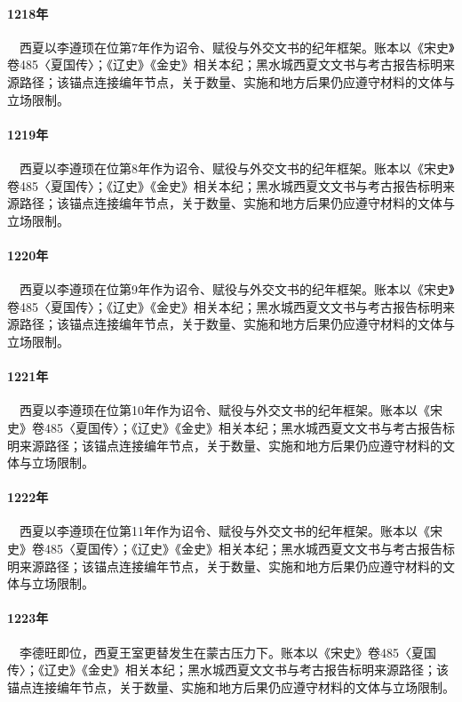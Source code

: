 \paragraph{1218年}　西夏以李遵顼在位第7年作为诏令、赋役与外交文书的纪年框架。账本以《宋史》卷485〈夏国传〉；《辽史》《金史》相关本纪；黑水城西夏文文书与考古报告标明来源路径；该锚点连接编年节点，关于数量、实施和地方后果仍应遵守材料的文体与立场限制。

\paragraph{1219年}　西夏以李遵顼在位第8年作为诏令、赋役与外交文书的纪年框架。账本以《宋史》卷485〈夏国传〉；《辽史》《金史》相关本纪；黑水城西夏文文书与考古报告标明来源路径；该锚点连接编年节点，关于数量、实施和地方后果仍应遵守材料的文体与立场限制。

\paragraph{1220年}　西夏以李遵顼在位第9年作为诏令、赋役与外交文书的纪年框架。账本以《宋史》卷485〈夏国传〉；《辽史》《金史》相关本纪；黑水城西夏文文书与考古报告标明来源路径；该锚点连接编年节点，关于数量、实施和地方后果仍应遵守材料的文体与立场限制。

\paragraph{1221年}　西夏以李遵顼在位第10年作为诏令、赋役与外交文书的纪年框架。账本以《宋史》卷485〈夏国传〉；《辽史》《金史》相关本纪；黑水城西夏文文书与考古报告标明来源路径；该锚点连接编年节点，关于数量、实施和地方后果仍应遵守材料的文体与立场限制。

\paragraph{1222年}　西夏以李遵顼在位第11年作为诏令、赋役与外交文书的纪年框架。账本以《宋史》卷485〈夏国传〉；《辽史》《金史》相关本纪；黑水城西夏文文书与考古报告标明来源路径；该锚点连接编年节点，关于数量、实施和地方后果仍应遵守材料的文体与立场限制。

\paragraph{1223年}　李德旺即位，西夏王室更替发生在蒙古压力下。账本以《宋史》卷485〈夏国传〉；《辽史》《金史》相关本纪；黑水城西夏文文书与考古报告标明来源路径；该锚点连接编年节点，关于数量、实施和地方后果仍应遵守材料的文体与立场限制。

